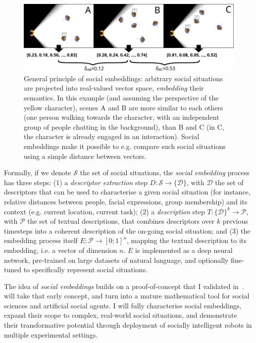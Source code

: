 \begin{figure}[H]
    \centering
    \includegraphics[width=0.9\linewidth]{figs/social-embeddings}
    \caption{General principle of social embeddings: arbitrary social situations
    are projected into real-valued vector space, \emph{embedding} their
    semantics. In this example (and assuming the perspective of the yellow
    character), scenes A and B  are more similar to each others (one person
    walking towards the character, with an independent group of people chatting
    in the background), than B and C (in C, the character is already engaged in
    an interaction).  Social embeddings make it possible to e.g. compare such
    social situations using a simple distance between vectors.}

    \label{fig:social-embeddings}
\end{figure}


Formally, if we denote $\mathcal{S}$ the set of social situations, the
\emph{social embedding} process has three steps: (1) a \emph{descriptor
extraction} step $D : \mathcal{S} \to \{\mathcal{D}\}$, with $\mathcal{D}$ the
set of descriptors that can be used to characterise a given social situation
(for instance, relative distances between people, facial expressions, group
membership) and its context (e.g. current
location, current task); (2) a \emph{description} step $T: \{\mathcal{D}\}^k
\to \mathcal{P}$, with $\mathcal{P}$ the set of textual descriptions, that
combines descriptors over $k$ previous timesteps into a coherent description
of the on-going social situation; and (3) the embedding process itself $E : \mathcal{P}
\to [0;1]^n$, mapping the textual description to its embedding, i.e. a
vector of dimension $n$. $E$ is implemented as a deep neural
network, pre-trained on large datasets of natural language, and optionally
fine-tuned to specifically represent social situations.

The idea of \emph{social embeddings} builds on a proof-of-concept that I
validated in~\cite{lemaignan2024social}. \project will take that
early concept, and turn into a mature mathematical tool for social sciences and
artificial social agents. I will fully characterise social embeddings, expand
their scope to complex, real-world social situations, and demonstrate their
transformative potential through deployment of socially intelligent robots in
multiple experimental settings.

